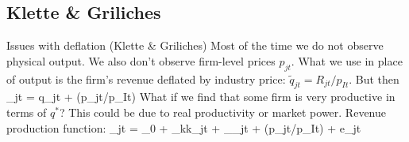 %
%

\subsection{Klette \& Griliches}

\begin{frame}{Issues with deflation (Klette \& Griliches)}
	Most of the time we do not observe physical output. We also don't observe firm-level prices $p_{jt}$. What we use in place of output is the firm's revenue deflated by industry price: $\tilde{q}_{jt} = R_{jt}/p_{It}$. But then
	\be
		_{jt} = q_{jt} + \ln(p_{jt}/p_{It})
	\ee
	What if we find that some firm is very productive in terms of $q^*$? This could be due to real productivity or market power. Revenue production function:
	\be
		_{jt} = \beta_0 + \beta_kk_{jt} + \beta_\ell\ell_{jt} + \ln(p_{jt}/p_{It}) + e_{jt}
	\ee
\end{frame}

